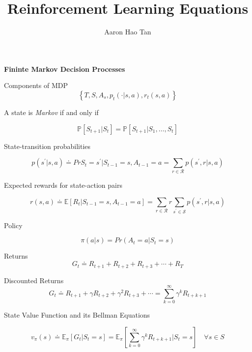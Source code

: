 \documentclass{article}
\author{Aaron Hao Tan}
\title{Reinforcement Learning Equations}
\date{\vspace{-5ex}}
\begin{document}
\maketitle

\noindent
\textbf{Fininte Markov Decision Processes}

\noindent
Components of MDP
\begin{equation}
\left\{T, S, A_{s}, p_{t}(\cdot | s, a), r_{t}(s, a)\right\}
\end{equation}

\noindent
A state is \textit{Markov} if and only if 

\begin{equation}
\mathbb{P}\left[S_{t+1} | S_{t}\right]=\mathbb{P}\left[S_{t+1} | S_{1}, \ldots, S_{t}\right]
\end{equation}

\noindent
State-transition probabilities

\begin{equation}
p(s^{\prime} | s, a) \doteq Pr{S_{t}=s^{\prime} | S_{t-1}=s, A_{t-1}=a}=\sum_{r \in \mathcal{R}} p(s^{\prime}, r | s, a)
\end{equation}

\noindent
Expected rewards for state-action pairs

\begin{equation}
r(s, a) \doteq \mathbb{E} \left[R_{t} | S_{t-1}=s, A_{t-1}=a\right]=\sum_{r \in \mathcal{R}} r \sum_{s^{\prime} \in \mathcal{S}} p\left(s^{\prime}, r | s, a\right)
\end{equation}

\noindent
Policy

\begin{equation}
\pi(a | s)= Pr(A_{t} = a | S_{t}=s)
\end{equation}

\noindent
Returns
\begin{equation}
G_{t} \doteq R_{t+1}+R_{t+2}+R_{t+3}+\cdots+R_{T}
\end{equation}

\noindent
Discounted Returns
\begin{equation}
G_{t} \doteq R_{t+1}+\gamma R_{t+2}+\gamma^{2} R_{t+3}+\cdots=\sum_{k=0}^{\infty} \gamma^{k} R_{t+k+1}
\end{equation}

\noindent
State Value Function and its Bellman Equations

\begin{equation}
v_{\pi}(s) \doteq \mathbb{E}_{\pi}[G_{t} | S_{t}=s]=\mathbb{E}_{\pi}[\sum_{k=0}^{\infty} \gamma^{k} R_{t+k+1} | S_{t}=s] \quad \forall s \in S
\end{equation}
\end{document}
